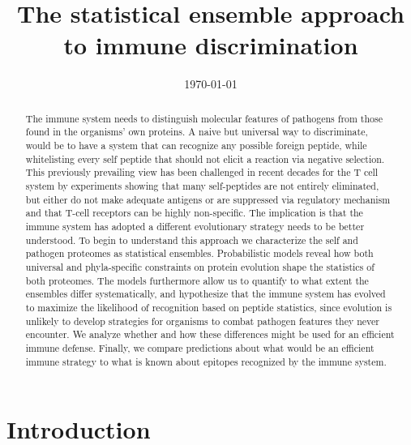 \documentclass[superscriptaddress,twocolumn,pre]{revtex4}
\newcommand{\<}{\langle}
\renewcommand{\>}{\rangle}
\begin{document}
\title{The statistical ensemble approach to immune discrimination}
\date{\today}

\begin{abstract}
The immune system needs to distinguish molecular features of pathogens from those found in the organisms' own proteins. A naive but universal way to discriminate, would be to have a system that can recognize any possible foreign peptide, while whitelisting every self peptide that should not elicit a reaction via negative selection. This previously prevailing view has been challenged in recent decades for the T cell system by experiments showing that many self-peptides are not entirely eliminated, but either do not make adequate antigens or are suppressed via regulatory mechanism and that T-cell receptors can be highly non-specific. The implication is that the immune system has adopted a different evolutionary strategy needs to be better understood. To begin to understand this approach we characterize the self and pathogen proteomes as statistical ensembles. Probabilistic models reveal how both universal and phyla-specific constraints on protein evolution shape the statistics of both proteomes. The models furthermore allow us to quantify to what extent the ensembles differ systematically, and hypothesize that the immune system has evolved to maximize the likelihood of recognition based on peptide statistics, since evolution is unlikely to develop strategies for organisms to combat pathogen features they never encounter. We analyze whether and how these differences might be used for an efficient immune defense. Finally, we compare predictions about what would be an efficient immune strategy to what is known about epitopes recognized by the immune system. 
\end{abstract}

\maketitle

\section{Introduction}
\end{document}
